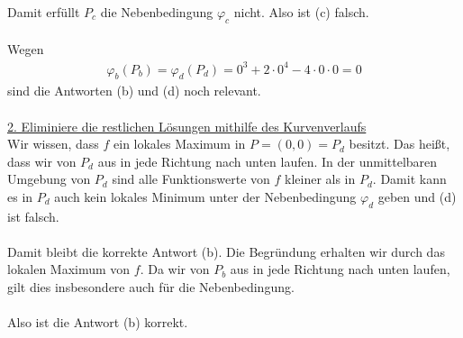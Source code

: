 Damit erfüllt $ P_c $ die Nebenbedingung $ \varphi_c  $ nicht. Also ist (c) falsch.\\
\\
Wegen 
\begin{align*}
\varphi_b(P_b) = \varphi_d(P_d) = 0^3 + 2 \cdot  0^4- 4 \cdot 0 \cdot 0 =0
\end{align*}
sind die Antworten (b) und (d) noch relevant.\\
\\
\newpage
\underline{2. Eliminiere die restlichen Lösungen mithilfe des Kurvenverlaufs}\\
Wir wissen, dass $ f $ ein lokales Maximum in $ P = (0,0) = P_d $ besitzt.
Das heißt, dass wir von $ P_d $ aus in jede Richtung nach unten laufen.
In der unmittelbaren Umgebung von $ P_d $ sind alle Funktionswerte von $ f $ kleiner als in $ P_d $.
Damit kann es in $ P_d $ auch kein lokales Minimum unter der Nebenbedingung $ \varphi_d $ geben und (d) ist falsch.\\
\\
Damit bleibt die korrekte Antwort (b).
Die Begründung erhalten wir durch das lokalen Maximum von $ f $.
Da wir von $ P_b $ aus in jede Richtung nach unten laufen, gilt dies insbesondere auch für die Nebenbedingung.\\
\\
Also ist die Antwort (b) korrekt.

\newpage
